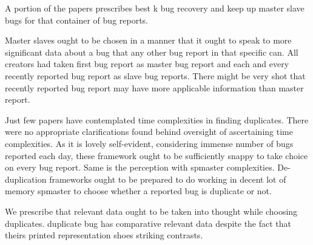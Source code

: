 \documentclass[]{sig-alternate-05-2015}
\begin{document}
A portion of the papers prescribes best k bug recovery and keep up master slave bugs for that container of bug reports. \newline

Master slaves ought to be chosen in a manner that it ought to speak to more significant data about a bug that any other bug report in that specific can. All creators had taken first bug report as master bug report and each and every recently reported bug report as slave bug reports. There might be very shot that recently reported bug report may have more applicable information than master report. \newline

Just few papers have contemplated time complexities in finding duplicates. There were no appropriate clarifications found behind oversight of ascertaining time complexities. As it is lovely self-evident, considering immense number of bugs reported each day, these framework ought to be sufficiently snappy to take choice on every bug report. Same is the perception with spmaster complexities. De-duplication frameworks ought to be prepared to do working in decent lot of memory spmaster to choose whether a reported bug is duplicate or not. \newline

We prescribe that relevant data ought to be taken into thought while choosing duplicates. duplicate bug has comparative relevant data despite the fact that theirs printed representation shoes striking contrasts.


%
%
\end{document}
